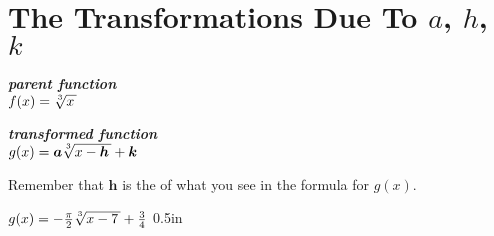 \section{The Transformations Due To $a$, $h$, $k$}

\begin{tcbraster}[
    raster equal height,
    raster left skip = 1in, raster right skip = 1in, 
    raster column skip = 0.5in,
    raster before skip = 1\baselineskip, raster after skip = 1\baselineskip,
    ]
    \begin{tcolorbox}[]
        \centering
        {\bfseries\itshape parent function}\\[0.5\baselineskip]
        \large
        $f(x) = \myRoot[3]{x}$
    \end{tcolorbox}
    \begin{tcolorbox}[]
        \centering
        {\bfseries\itshape transformed function}\\[0.5\baselineskip]
        \large
        $g(x) = \bm{a} \myRoot[3]{x-\bm{h}} + \bm{k}$
    \end{tcolorbox}
\end{tcbraster}

\begin{tcbraster}[]
\end{tcbraster}


\begin{myWarningBox}
    \begin{center}
        Remember that $\bm{h}$ is the  
        of what you see in the formula for $g(x)$.
    \end{center}
\end{myWarningBox}



{
    $g(x) = -\frac{\pi}{2}\myRoot[3]{x-7} + \frac{3}{4}$
}{0.5in}


